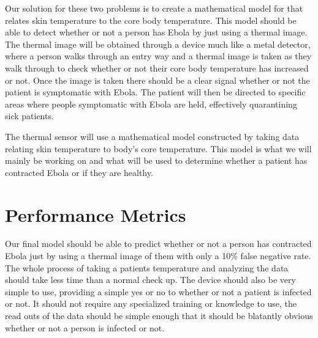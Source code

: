 \documentclass{article}
\begin{document}
Our solution for these two problems is to create a mathematical model for that relates skin temperature to the core body temperature. This model should be able to detect whether or not a person has Ebola by just using a thermal image. The thermal image will be obtained through a device much like a metal detector, where a person walks through an entry way and a thermal image is taken as they walk through to check whether or not their core body temperature has increased or not. Once the image is taken there should be a clear signal whether or not the patient is symptomatic with Ebola. The patient will then be directed to specific areas where people symptomatic with Ebola are held, effectively quarantining sick patients.

The thermal sensor will use a mathematical model constructed by taking data relating skin temperature to body's core temperature. This model is what we will mainly be working on and what will be used to determine whether a patient has contracted Ebola or if they are healthy.

\section{Performance Metrics}
Our final model should be able to predict whether or not a person has contracted Ebola just by using a thermal image of them with only a 10\% false negative rate. The whole process of taking a patients temperature and analyzing the data should take less time than a normal check up. The device should also be very simple to use, providing a simple yes or no to whether or not a patient is infected or not. It should not require any specialized training or knowledge to use, the read outs of the data should be simple enough that it should be blatantly obvious whether or not a person is infected or not.
\end{document}
